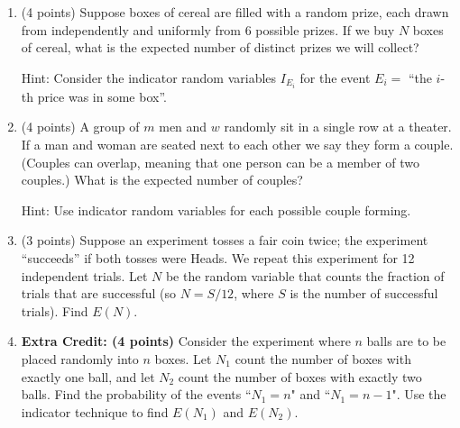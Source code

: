 \documentclass[11pt]{article}
\begin{document}
\begin{enumerate}
\item (4 points) Suppose boxes of cereal are filled with a random prize,
each drawn from independently and uniformly from $6$ possible prizes.
If we buy $N$ boxes of cereal, what is the expected number of distinct
prizes we will collect? \begin{small}\textsf{Hint: Consider the indicator
random variables $I_{E_i}$ for the event $E_i =$ ``the $i$-th price was
in some box''.}\end{small}

\item (4 points) A group of $m$ men and $w$ randomly sit in a single row at a
theater.  If a man and woman are seated next to each other we say they form a
couple.  (Couples can overlap, meaning that one person can be a member of two
couples.)  What is the expected number of couples?
\begin{small}\textsf{Hint: Use indicator
random variables for each possible couple forming.
}\end{small}


\item (3 points) Suppose an experiment tosses a fair coin twice;  the experiment
``succeeds'' if both tosses were Heads.  We repeat this experiment 
for 12 independent trials.  Let $N$ be the random variable that counts
the fraction of trials that are successful (so $N = S/12$, where
$S$ is the number of successful trials).  Find $E(N)$.

\item \textbf{Extra Credit: (4 points)} Consider the experiment where $n$ balls
are to be placed randomly into $n$ boxes. Let $N_1$ count the number of boxes
with exactly one ball, and let $N_2$ count the number of boxes with exactly two
balls. Find the probability of the events ``$N_1 = n$" and ``$N_1 = n - 1$".
Use the indicator technique to find $E(N_1)$ and $E(N_2)$.


\end{enumerate}
\end{document}
